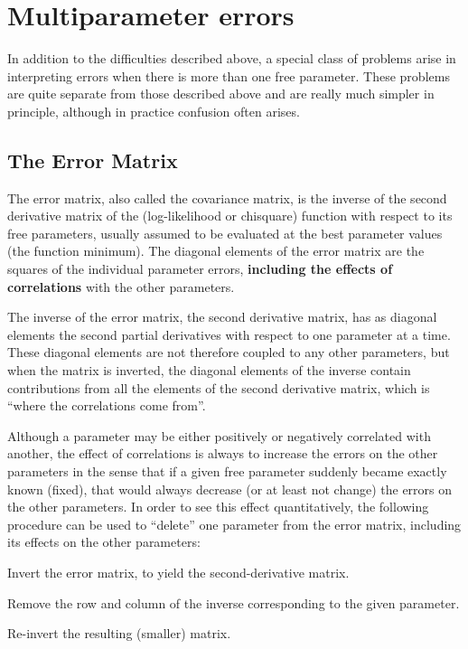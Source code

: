 \section{Multiparameter errors}
\label{sec:errormultipar}
 
In addition to the difficulties described above, a special class of 
problems arise in interpreting errors when there is more than one 
free parameter. These problems are quite separate from those 
described above and are really much simpler in principle, although in 
practice confusion often arises.
 
\subsection{The Error Matrix}
 
The error matrix, also called the covariance matrix, is the inverse of 
the second derivative matrix of the (log-likelihood or chisquare) 
function with respect to its free parameters, usually assumed to be 
evaluated at the best parameter values (the function minimum). The 
diagonal elements of the error matrix are the squares of the 
%
individual parameter errors, {\bf including the effects of correlations}
with the other parameters.
 
The inverse of the error matrix, the second derivative matrix, has as 
diagonal elements the second partial derivatives with respect to one 
parameter at a time. These diagonal elements are not therefore 
coupled to any other parameters, but when the matrix is inverted, 
the diagonal elements of the inverse contain contributions from all 
the elements of the second derivative matrix, which is ``where the 
correlations come from''.
 
Although a parameter may be either positively or negatively 
correlated with another, the effect of correlations is always to 
increase the errors on the other parameters in the sense that if a 
given free parameter suddenly became exactly known (fixed), that 
would always decrease (or at least not change) the errors on the 
other parameters. In order to see this effect quantitatively, the 
following procedure can be used to ``delete'' one parameter from the 
error matrix, including its effects on the other parameters:
 
\begin{OL}
\item Invert the error matrix, to yield the second-derivative matrix.
\item Remove the row and column of the inverse corresponding to the 
      given parameter.
\item Re-invert the resulting (smaller) matrix.
\end{OL}
 
